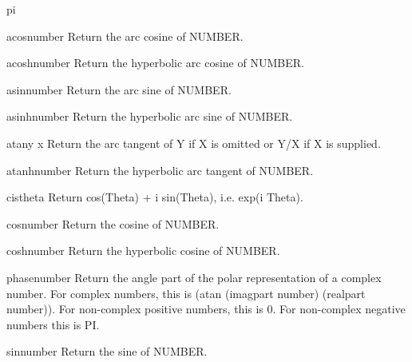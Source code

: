 \documentclass[10pt,english]{book}
\begin{document}
\begin{constant}{pi}{}
  
\end{constant}

\begin{function}{acos}{number}
  Return the arc cosine of NUMBER.
\end{function}

\begin{function}{acosh}{number}
  Return the hyperbolic arc cosine of NUMBER.
\end{function}

\begin{function}{asin}{number}
  Return the arc sine of NUMBER.
\end{function}

\begin{function}{asinh}{number}
  Return the hyperbolic arc sine of NUMBER.
\end{function}

\begin{function}{atan}{y \op x}
  Return the arc tangent of Y if X is omitted or Y/X if X is supplied.
\end{function}

\begin{function}{atanh}{number}
  Return the hyperbolic arc tangent of NUMBER.
\end{function}

\begin{function}{cis}{theta}
  Return cos(Theta) + i sin(Theta), i.e. exp(i Theta).
\end{function}

\begin{function}{cos}{number}
  Return the cosine of NUMBER.
\end{function}

\begin{function}{cosh}{number}
  Return the hyperbolic cosine of NUMBER.
\end{function}

\begin{function}{phase}{number}
  Return the angle part of the polar representation of a complex number.
  For complex numbers, this is (atan (imagpart number) (realpart number)).
  For non-complex positive numbers, this is 0. For non-complex negative
  numbers this is PI.
\end{function}

\begin{function}{sin}{number}
  Return the sine of NUMBER.
\end{function}
\end{document}
